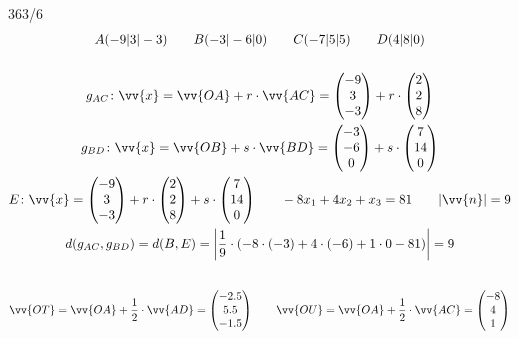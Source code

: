 \begin{exercise}{363/6}
  \begin{gather*}
    A(-9|3|-3) \qquad B(-3|-6|0) \qquad C(-7|5|5) \qquad D(4|8|0) \\\\
    g_{AC} \colon \vv{x} = \vv{OA} + r \cdot \vv{AC} = \begin{pmatrix}-9 \\ 3 \\ -3\end{pmatrix} + r \cdot \begin{pmatrix}2 \\ 2 \\ 8\end{pmatrix} \\
    g_{BD} \colon \vv{x} = \vv{OB} + s \cdot \vv{BD} = \begin{pmatrix}-3 \\ -6 \\ 0\end{pmatrix} + s \cdot \begin{pmatrix}7 \\ 14 \\ 0\end{pmatrix} \\
    E \colon \vv{x} = \begin{pmatrix}-9 \\ 3 \\ -3\end{pmatrix} + r \cdot \begin{pmatrix}2 \\ 2 \\ 8\end{pmatrix} + s \cdot \begin{pmatrix}7 \\ 14 \\ 0\end{pmatrix} \qquad -8x_1 + 4x_2 + x_3 = 81 \qquad |\vv{n}| = 9 \\
    d(g_{AC}, g_{BD}) = d(B, E) = \left|\frac{1}{9} \cdot (-8 \cdot (-3) + 4 \cdot (-6) + 1 \cdot 0 - 81)\right| = 9 \\\\
  \end{gather*}
  \begin{gather*}
    \vv{OT} = \vv{OA} + \frac{1}{2} \cdot \vv{AD} = \begin{pmatrix}-2.5 \\ 5.5 \\ -1.5\end{pmatrix} \qquad \vv{OU} = \vv{OA} + \frac{1}{2} \cdot \vv{AC} = \begin{pmatrix}-8 \\ 4 \\ 1\end{pmatrix} \\

\end{gather*}
\end{exercise}
